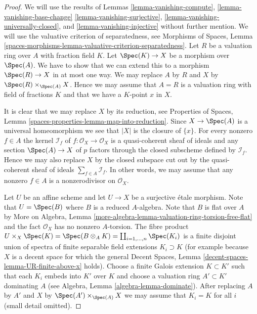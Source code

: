 \begin{proof}
We will use the results of
Lemmas \ref{lemma-vanishing-compute},
\ref{lemma-vanishing-base-change}
\ref{lemma-vanishing-surjective},
\ref{lemma-vanishing-universally-closed}, and
\ref{lemma-vanishing-injective}
without further mention.
We will use the valuative criterion of separatedness, see
Morphisms of Spaces, Lemma
\ref{spaces-morphisms-lemma-valuative-criterion-separatedness}.
Let $R$ be a valuation ring over $A$ with fraction field $K$.
Let $\Spec(K) \to X$ be a morphism over $\Spec(A)$. We have
to show that we can extend this to a morphism $\Spec(R) \to X$
in at most one way. We may replace $A$ by $R$ and $X$ by
$\Spec(R) \times_{\Spec(A)} X$. Hence we may assume that $A = R$
is a valuation ring with field of fractions $K$ and that we have a
$K$-point $x$ in $X$.

\medskip\noindent
It is clear that we may replace $X$ by its reduction, see
Properties of Spaces, Lemma
\ref{spaces-properties-lemma-map-into-reduction}.
Since $X \to \Spec(A)$ is a universal homeomorphism we see
that $|X|$ is the closure of $\{x\}$. For every nonzero $f \in A$
the kernel $\mathcal{I}_f$ of $f : \mathcal{O}_X \to \mathcal{O}_X$
is a quasi-coherent sheaf of ideals and any section $\Spec(A) \to X$
of $p$ factors through the closed subscheme defined by $\mathcal{I}_f$.
Hence we may also replace $X$ by the closed subspace cut out by
the quasi-coherent sheaf of ideals $\sum_{f \in A} \mathcal{I}_f$.
In other words, we may assume that any nonzero $f \in A$ is a
nonzerodivisor on $\mathcal{O}_X$.

\medskip\noindent
Let $U$ be an affine scheme and let $U \to X$ be a surjective \'etale
morphism. Note that $U = \Spec(B)$ where $B$ is a reduced $A$-algebra.
Note that $B$ is flat over $A$ by More on Algebra, Lemma
\ref{more-algebra-lemma-valuation-ring-torsion-free-flat}
and the fact $\mathcal{O}_X$ has no nonzero $A$-torsion.
The fibre product $U \times_X \Spec(K) = \Spec(B \otimes_A K) =
\coprod_{i = 1, \ldots, n} \Spec(K_i)$ is a finite disjoint union
of spectra of finite separable field extensions $K_i \supset K$ (for example
because $X$ is a decent space for which the general
Decent Spaces, Lemma \ref{decent-spaces-lemma-UR-finite-above-x} holds).
Choose a finite Galois extension $K \subset K'$ such that each $K_i$
embeds into $K'$ over $K$ and choose a valuation ring $A' \subset K'$
dominating $A$ (see
Algebra, Lemma \ref{algebra-lemma-dominate}).
After replacing $A$ by $A'$ and $X$ by $\Spec(A') \times_{\Spec(A)} X$
we may assume that $K_i = K$ for all $i$ (small detail omitted).


\end{proof}
